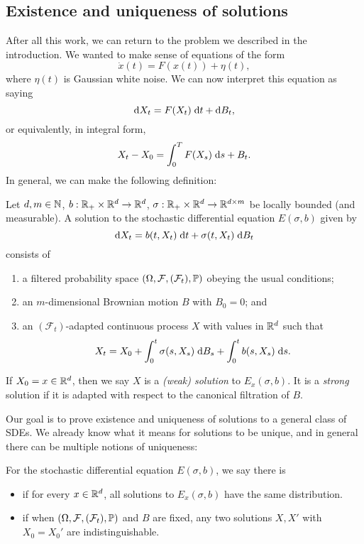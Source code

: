 \documentclass[a4paper]{article}
\begin{document}
\subsection{Existence and uniqueness of solutions}
After all this work, we can return to the problem we described in the introduction. We wanted to make sense of equations of the form
\[
  \dot{x}(t) = F(x(t)) + \eta(t),
\]
where $\eta(t)$ is Gaussian white noise. We can now interpret this equation as saying
\[
  \d X_t = F(X_t)\;\d t + \d B_t,
\]
or equivalently, in integral form,
\[
  X_t - X_0 = \int_0^T F(X_s) \;\d s+ B_t.
\]
In general, we can make the following definition:
\begin{defi}
  Let $d, m \in \N$, $b:\R_+ \times \R^d \to \R^d$, $\sigma: \R_+ \times \R^d \to \R^{d \times m}$ be locally bounded (and measurable). A solution to the stochastic differential equation $E(\sigma, b)$ given by
  \[
    \d X_t = b(t, X_t) \;\d t + \sigma(t, X_t) \;\d B_t
  \]
  consists of
  \begin{enumerate}
    \item a filtered probability space $(\Omega, \mathcal{F}, (\mathcal{F}_t), \P)$ obeying the usual conditions;
    \item an $m$-dimensional Brownian motion $B$ with $B_0 = 0$; and
    \item an $(\mathcal{F}_t)$-adapted continuous process $X$ with values in $\R^d$ such that
      \[
        X_t = X_0 + \int_0^t \sigma(s, X_s) \;\d B_s + \int_0^t b(s, X_s) \;\d s.
      \]
  \end{enumerate}
  If $X_0 = x \in \R^d$, then we say $X$ is a \emph{(weak) solution} to $E_x(\sigma, b)$. It is a \emph{strong} solution if it is adapted with respect to the canonical filtration of $B$.
\end{defi}
Our goal is to prove existence and uniqueness of solutions to a general class of SDEs. We already know what it means for solutions to be unique, and in general there can be multiple notions of uniqueness:

\begin{defi}
  For the stochastic differential equation $E(\sigma, b)$, we say there is
  \begin{itemize}
    \item {} if for every $x \in \R^d$, all solutions to $E_x(\sigma, b)$ have the same distribution.
    \item {} if when $(\Omega, \mathcal{F}, (\mathcal{F}_t), \P)$ and $B$ are fixed, any two solutions $X, X'$ with $X_0 = X_0'$ are indistinguishable.
  \end{itemize}
\end{defi}
\end{document}
